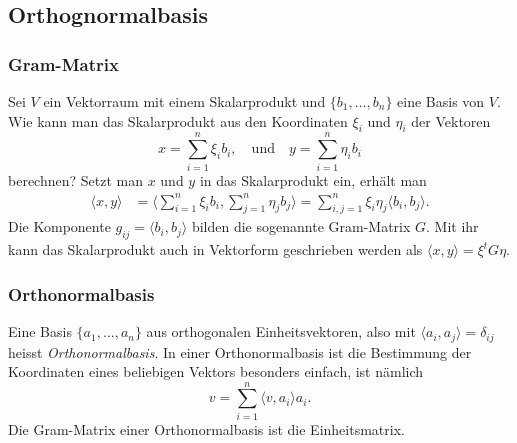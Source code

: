 \subsection{Orthognormalbasis
\label{buch:subsection:orthonormalbasis}}
%

\subsubsection{Gram-Matrix}
Sei $V$ ein Vektorraum mit einem Skalarprodukt und $\{b_1,\dots,b_n\}$ eine
Basis von $V$.
Wie kann man das Skalarprodukt aus den Koordinaten $\xi_i$ und $\eta_i$
der Vektoren 
\[
x = \sum_{i=1}^n \xi_i b_i,
\quad\text{und}\quad
y = \sum_{i=1}^n \eta_i b_i
\]
berechnen?
Setzt man $x$ und $y$ in das Skalarprodukt ein, erhält man
\begin{align*}
\langle x,y\rangle
&=
\biggl\langle
\sum_{i=1}^n \xi_i b_i,
\sum_{j=1}^n \eta_j b_j
\biggr\rangle
=
\sum_{i,j=1}^n \xi_i\eta_j \langle b_i,b_j\rangle.
\end{align*}
Die Komponente $g_{ij}=\langle b_i,b_j\rangle$ bilden die sogenannte
Gram-Matrix $G$.
Mit ihr kann das Skalarprodukt auch in Vektorform geschrieben werden
als $\langle x,y\rangle = \xi^t G\eta$.

\subsubsection{Orthonormalbasis}
Eine Basis $\{a_1,\dots,a_n\}$ aus orthogonalen Einheitsvektoren,
also mit
$
\langle a_i,a_j\rangle=\delta_{ij}
$
heisst {\em Orthonormalbasis}.
In einer Orthonormalbasis ist die Bestimmung der Koordinaten eines
beliebigen Vektors besonders einfach, ist nämlich
\begin{equation}
v=\sum_{i=1}^n \langle v,a_i\rangle a_i.
\label{buch:grundlagen:eqn:koordinaten-in-orthonormalbasis}
\end{equation}
Die Gram-Matrix einer Orthonormalbasis ist die Einheitsmatrix.

